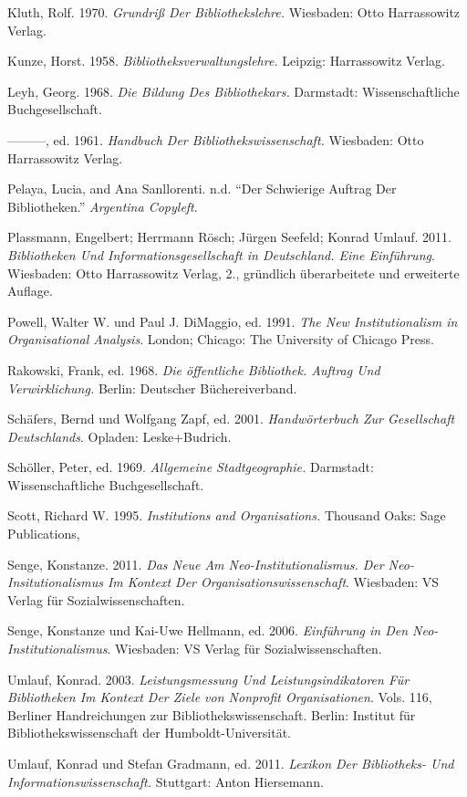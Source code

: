 \documentclass[a4paper,
fontsize=11pt,
oneside,
numbers=noperiodatend,
parskip=half-,
bibliography=totoc,
final
]{scrartcl}
\begin{document}
Kluth, Rolf. 1970. \emph{Grundriß Der Bibliothekslehre.} Wiesbaden: Otto
Harrassowitz Verlag.

Kunze, Horst. 1958. \emph{Bibliotheksverwaltungslehre.} Leipzig:
Harrassowitz Verlag.

Leyh, Georg. 1968. \emph{Die Bildung Des Bibliothekars.} Darmstadt:
Wissenschaftliche Buchgesellschaft.

---------, ed. 1961. \emph{Handbuch Der Bibliothekswissenschaft.}
Wiesbaden: Otto Harrassowitz Verlag.

Pelaya, Lucia, and Ana Sanllorenti. n.d. \enquote{Der Schwierige Auftrag
Der Bibliotheken.} \emph{Argentina Copyleft}.

Plassmann, Engelbert; Herrmann Rösch; Jürgen Seefeld; Konrad Umlauf.
2011. \emph{Bibliotheken Und Informationsgesellschaft in Deutschland.
Eine Einführung}. Wiesbaden: Otto Harrassowitz Verlag, 2., gründlich
überarbeitete und erweiterte Auflage.

Powell, Walter W. und Paul J. DiMaggio, ed. 1991. \emph{The New
Institutionalism in Organisational Analysis}. London; Chicago: The
University of Chicago Press.

Rakowski, Frank, ed. 1968. \emph{Die öffentliche Bibliothek. Auftrag Und
Verwirklichung.} Berlin: Deutscher Büchereiverband.

Schäfers, Bernd und Wolfgang Zapf, ed. 2001. \emph{Handwörterbuch Zur
Gesellschaft Deutschlands}. Opladen: Leske+Budrich.

Schöller, Peter, ed. 1969. \emph{Allgemeine Stadtgeographie.} Darmstadt:
Wissenschaftliche Buchgesellschaft.

Scott, Richard W. 1995. \emph{Institutions and Organisations.} Thousand
Oaks: Sage Publications,

Senge, Konstanze. 2011. \emph{Das Neue Am Neo-Institutionalismus. Der
Neo-Insitutionalismus Im Kontext Der Organisationswissenschaft}.
Wiesbaden: VS Verlag für Sozialwissenschaften.

Senge, Konstanze und Kai-Uwe Hellmann, ed. 2006. \emph{Einführung in Den
Neo-Institutionalismus}. Wiesbaden: VS Verlag für Sozialwissenschaften.

Umlauf, Konrad. 2003. \emph{Leistungsmessung Und Leistungsindikatoren
Für Bibliotheken Im Kontext Der Ziele von Nonprofit Organisationen}.
Vols. 116, Berliner Handreichungen zur Bibliothekswissenschaft. Berlin:
Institut für Bibliothekswissenschaft der Humboldt-Universität.

Umlauf, Konrad und Stefan Gradmann, ed. 2011. \emph{Lexikon Der
Bibliotheks- Und Informationswissenschaft.} Stuttgart: Anton Hiersemann.
\end{document}
